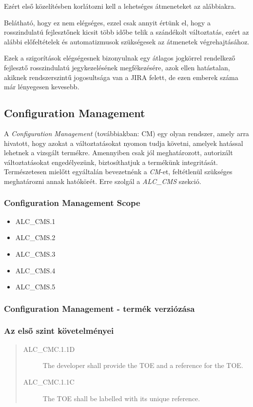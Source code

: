 Ezért első közelítésben korlátozni kell a lehetséges átmeneteket az alábbiakra.

Belátható, hogy ez nem elégséges, ezzel csak annyit értünk el, hogy a rosszindulatú fejlesztőnek
kicsit több időbe telik a szándékolt változtatás, ezért az alábbi előfeltételek és automatizmusok
szükségesek az átmenetek végrehajtásához.

Ezek a szigorítások elégségesnek bizonyulnak egy átlagos jogkörrel rendelkező fejlesztő
rosszindulatú jegykezelésének megfékezésére, azok ellen hatástalan, akiknek rendszerszintű
jogosultsága van a JIRA felett, de ezen emberek száma már lényegesen kevesebb.

\subsection{Configuration Management}
A \emph{Configuration Management} (továbbiakban: CM) egy olyan rendszer, amely arra hivatott,
hogy azokat a változtatásokat nyomon tudja követni, amelyek hatással lehetnek a vizsgált termékre.
Amennyiben csak jól meghatározott, autorizált változtatásokat engedélyezünk, biztosíthatjuk a
termékünk integritását.
Természetesen mielőtt egyáltalán bevezetnénk a \emph{CM}-et, feltétlenül szükséges meghatározni
annak hatókörét. Erre szolgál a \emph{ALC\_CMS} szekció.

\subsubsection{Configuration Management Scope}
\begin{itemize}
    \item{ALC\_CMS.1}
    \item{ALC\_CMS.2}
    \item{ALC\_CMS.3}
    \item{ALC\_CMS.4}
    \item{ALC\_CMS.5}
\end{itemize}

\pagebreak[0]
\subsubsection{Configuration Management - termék verziózása}
\subsubsection{Az első szint követelményei}
\begin{quote}
    \begin{description}
        \item[ALC\_CMC.1.1D]{The developer shall provide the TOE and a reference for the TOE.}
        \item[ALC\_CMC.1.1C]{The TOE shall be labelled with its unique reference.}
    \end{description}
\end{quote}

